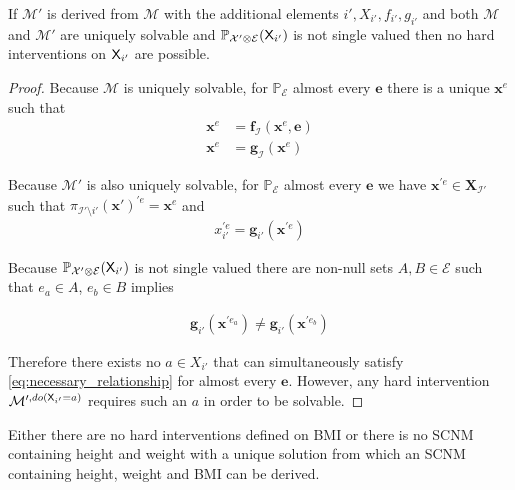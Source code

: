 \begin{theorem}\label{th:no_interventions}
If $\mathcal{M}'$ is derived from $\mathcal{M}$ with the additional elements $i',X_{i'},f_{i'},g_{i'}$ and both $\mathcal{M}$ and $\mathcal{M}'$ are uniquely solvable and $\mathbb{P}_{\mathcal{X}'\otimes\mathcal{E}}(\mathsf{X}_{i'})$ is not single valued then no hard interventions on $\mathsf{X}_{i'}$ are possible.
\end{theorem}

\begin{proof}
Because $\mathcal{M}$ is uniquely solvable, for $\mathbb{P}_{\mathcal{E}}$ almost every $\mathbf{e}$ there is a unique $\mathbf{x}^e$ such that
\begin{align}
	\mathbf{x}^e &= \mathbf{f}_{\mathcal{I}}(\mathbf{x}^e,\mathbf{e})\\
	\mathbf{x}^e &= \mathbf{g}_{\mathcal{I}}(\mathbf{x}^e)
\end{align}

Because $\mathcal{M}'$ is also uniquely solvable, for $\mathbb{P}_{\mathcal{E}}$ almost every $\mathbf{e}$ we have $\mathbf{x}^{\prime e}\in\mathbf{X}_{\mathcal{I}'}$ such that $\pi_{\mathcal{I'}\setminus{i'}}(\mathbf{x}')^{\prime e} = \mathbf{x}^e$ and
\begin{align}
	x^{\prime e}_{i'} = \mathbf{g}_{i'}(\mathbf{x}^{\prime e}) \label{eq:necessary_relationship}
\end{align}

Because $\mathbb{P}_{\mathcal{X}'\otimes\mathcal{E}}(\mathsf{X}_{i'})$ is not single valued there are non-null sets $A,B\in \mathcal{E}$ such that $e_a\in A$, $e_b\in B$ implies

\begin{align}
	\mathbf{g}_{i'}(\mathbf{x}^{\prime e_a}) \neq \mathbf{g}_{i'}(\mathbf{x}^{\prime e_b})
\end{align}


Therefore there exists no $a\in X_{i'}$ that can simultaneously satisfy \ref{eq:necessary_relationship} for almost every $\mathbf{e}$. However, any hard intervention $\mathcal{M}^{\prime,do(\mathsf{X}_{i'}=a)}$ requires such an $a$ in order to be solvable.
\end{proof}

\begin{corollary}
Either there are no hard interventions defined on BMI or there is no SCNM containing height and weight with a unique solution from which an SCNM containing height, weight and BMI can be derived.
\end{corollary}

